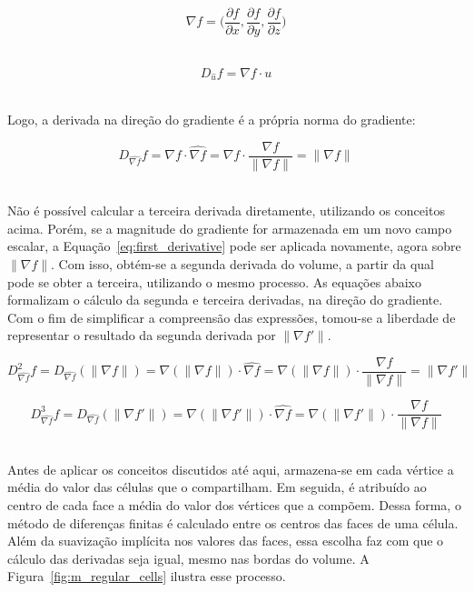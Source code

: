 \begin{equation}\label{eq:grad}
	\nabla f = \bigg(\frac{\partial f}{\partial x}, \frac{\partial f}{\partial y}, \frac{\partial f}{\partial z}\bigg)
\end{equation} \

\begin{equation}\label{eq:ddir}
D_{\widehat{u}} f = \nabla f \cdot u
\end{equation} \

	Logo, a derivada na direção do gradiente é a própria norma do gradiente:

\begin{equation}\label{eq:first_derivative}
	D_{\widehat{\nabla f}} f = \nabla f \cdot \widehat{\nabla f} = \nabla f \cdot \frac{\nabla f}{\|\nabla f\|} = \|\nabla f\|
\end{equation} \

	Não é possível calcular a terceira derivada diretamente, utilizando os conceitos acima. Porém, se a magnitude do gradiente for armazenada em um novo campo escalar, a Equação~\eqref{eq:first_derivative} pode ser aplicada novamente, agora sobre $ \|\nabla f\| $. Com isso, obtém-se a segunda derivada do volume, a partir da qual pode se obter a terceira, utilizando o mesmo processo. As equações abaixo formalizam o cálculo da segunda e terceira derivadas, na direção do gradiente. Com o fim de simplificar a compreensão das expressões, tomou-se a liberdade de representar o resultado da segunda derivada por $ \|\nabla f'\| $.
	
\begin{equation}\label{eq:second_derivative}
	D^{2}_{\widehat{\nabla f}} f = D_{\widehat{\nabla f}} (\|\nabla f\|) = \nabla (\|\nabla f\|) \cdot \widehat{\nabla f} = \nabla (\|\nabla f\|) \cdot \frac{\nabla f}{\|\nabla f\|} = \|\nabla f'\|
\end{equation}

\begin{equation}\label{eq:third_derivative}
	D^{3}_{\widehat{\nabla f}} f = D_{\widehat{\nabla f}} (\|\nabla f'\|) = \nabla (\|\nabla f'\|) \cdot \widehat{\nabla f} = \nabla (\|\nabla f'\|) \cdot \frac{\nabla f}{\|\nabla f\|}
\end{equation} \

	Antes de aplicar os conceitos discutidos até aqui, armazena-se em cada vértice a média do valor das células que o compartilham. Em seguida, é atribuído ao centro de cada face a média do valor dos vértices que a compõem. Dessa forma, o método de diferenças finitas é calculado entre os centros das faces de uma célula. Além da suavização implícita nos valores das faces, essa escolha faz com que o cálculo das derivadas seja igual, mesmo nas bordas do volume. A Figura~\ref{fig:m_regular_cells} ilustra esse processo.
	
